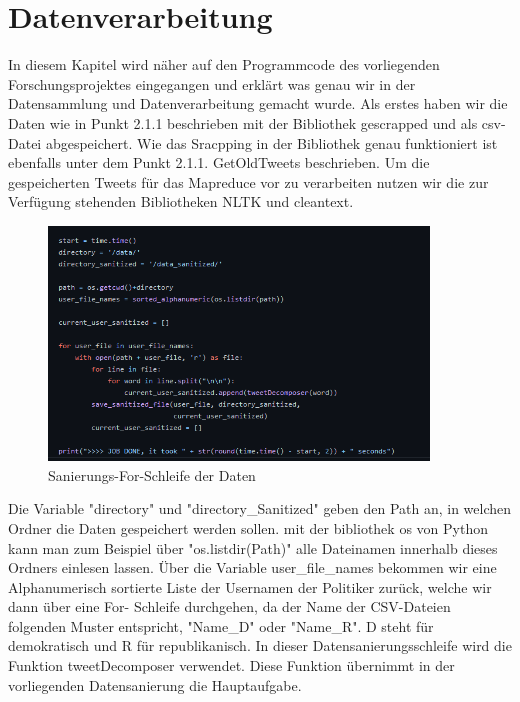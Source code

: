 \section{Datenverarbeitung}
	
	In diesem Kapitel wird näher auf den Programmcode des vorliegenden Forschungsprojektes eingegangen und erklärt was genau wir in der Datensammlung und 
	Datenverarbeitung gemacht wurde. 
	Als erstes haben wir die Daten wie in Punkt 2.1.1 beschrieben mit der Bibliothek gescrapped und als csv-Datei abgespeichert. Wie das Sracpping in der 
	Bibliothek genau funktioniert ist ebenfalls unter dem Punkt 2.1.1. GetOldTweets beschrieben. Um die gespeicherten Tweets für das Mapreduce vor zu 
	verarbeiten nutzen wir die zur Verfügung stehenden Bibliotheken NLTK und cleantext.
	
	
	\begin{figure}[ht]
		\centering
		\includegraphics[width=0.9\textwidth]{images/Kapitel2/Code_Datensanierung_1}
		\caption{\label{fig:DataSan}Sanierungs-For-Schleife der Daten}
	\end{figure}
	
	Die Variable "directory" und "directory_Sanitized" geben den Path an, in welchen Ordner die Daten gespeichert werden sollen. mit der bibliothek os von Python 
	kann man zum Beispiel über "os.listdir(Path)" alle Dateinamen innerhalb dieses Ordners einlesen lassen. 
	Über die Variable user_file_names bekommen wir eine Alphanumerisch sortierte Liste der Usernamen der Politiker zurück, welche wir dann über eine For-
	Schleife durchgehen, da der Name der CSV-Dateien folgenden Muster entspricht, "Name_D" oder "Name_R". D steht für demokratisch und R für 
	republikanisch. In dieser Datensanierungsschleife wird die Funktion tweetDecomposer verwendet. Diese Funktion übernimmt in der vorliegenden Datensanierung die 
	Hauptaufgabe. 
	
